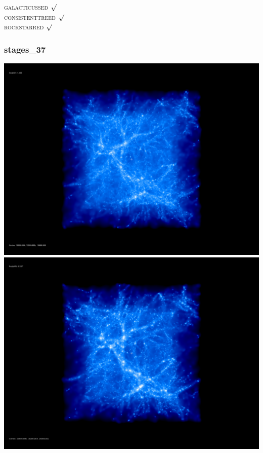 \textsc{galacticussed} $\surd$ \\
\textsc{consistenttreed} $\surd$ \\ 
\textsc{rockstarred} $\surd$

% 
%
%
%
%
%
%
%


\newpage
\subsubsection{stages\_37}

\includegraphics[scale=0.1]{r256/h100/stages_37/50.jpg} 
\includegraphics[scale=0.1]{r256/h100/stages_37/100.jpg}  \\

